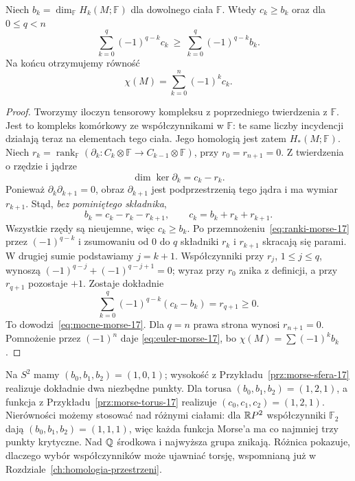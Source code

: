 \begin{twierdzenie}
\label{thm:nierownosci-morse-17}
Niech $b_k=\dim_{\mathbb F}H_k(M;\mathbb F)$
dla dowolnego ciała $\mathbb F$.
Wtedy $c_k\geq b_k$ oraz dla
$0\leq q<n$
\begin{equation}\label{eq:mocne-morse-17}
 \sum_{k=0}^q(-1)^{q-k}c_k
 \ \geq\
 \sum_{k=0}^q(-1)^{q-k}b_k.
\end{equation}
Na końcu otrzymujemy równość
\begin{equation}\label{eq:euler-morse-17}
 \chi(M)=\sum_{k=0}^n(-1)^kc_k.
\end{equation}
\end{twierdzenie}
\begin{proof}
Tworzymy iloczyn tensorowy kompleksu z poprzedniego
twierdzenia z $\mathbb F$.
Jest to kompleks komórkowy ze współczynnikami w $\mathbb F$:
te same liczby incydencji działają teraz na elementach tego ciała.
Jego homologią jest zatem $H_*(M;\mathbb F)$.
Niech $r_k=\operatorname{rank}_{\mathbb F}
(\partial_k:C_k\otimes\mathbb F
\to C_{k-1}\otimes\mathbb F)$,
przy $r_0=r_{n+1}=0$.
Z twierdzenia o rzędzie i jądrze
\[
 \dim\ker\partial_k=c_k-r_k.
\]
Ponieważ $\partial_k\partial_{k+1}=0$,
obraz $\partial_{k+1}$ jest podprzestrzenią
tego jądra i ma wymiar $r_{k+1}$.
Stąd, \emph{bez pominiętego składnika},
\begin{equation}\label{eq:ranki-morse-17}
 b_k=c_k-r_k-r_{k+1},
 \qquad c_k=b_k+r_k+r_{k+1}.
\end{equation}
Wszystkie rzędy są nieujemne,
więc $c_k\geq b_k$.
Po przemnożeniu~\eqref{eq:ranki-morse-17}
przez $(-1)^{q-k}$ i zsumowaniu
od $0$ do $q$ składniki $r_k$
i $r_{k+1}$ skracają się parami.
W drugiej sumie podstawiamy $j=k+1$.
Współczynniki przy $r_j$, $1\leq j\leq q$, wynoszą
$(-1)^{q-j}+(-1)^{q-j+1}=0$;
wyraz przy $r_0$ znika z definicji, a przy $r_{q+1}$ pozostaje $+1$.
Zostaje dokładnie
\[
 \sum_{k=0}^q(-1)^{q-k}(c_k-b_k)
   =r_{q+1}\geq0.
\]
To dowodzi~\eqref{eq:mocne-morse-17}.
Dla $q=n$ prawa strona wynosi
$r_{n+1}=0$. Pomnożenie
przez $(-1)^n$ daje
\eqref{eq:euler-morse-17},
bo $\chi(M)=\sum(-1)^kb_k$.
\end{proof}

\begin{przyklad}
Na $S^2$ mamy $(b_0,b_1,b_2)=(1,0,1)$;
wysokość z Przykładu~\ref{prz:morse-sfera-17}
realizuje dokładnie dwa niezbędne
punkty. Dla torusa
$(b_0,b_1,b_2)=(1,2,1)$,
a funkcja z
Przykładu~\ref{prz:morse-torus-17}
realizuje $(c_0,c_1,c_2)=(1,2,1)$.
Nierówności możemy stosować
nad różnymi ciałami: dla
$\mathbb{R} P^2$ współczynniki
$\mathbb F_2$ dają
$(b_0,b_1,b_2)=(1,1,1)$,
więc każda funkcja Morse'a
ma co najmniej trzy punkty
krytyczne. Nad $\mathbb{Q}$ środkowa
i najwyższa grupa znikają.
Różnica pokazuje, dlaczego
wybór współczynników może
ujawniać torsję, wspomnianą
już w
Rozdziale~\ref{ch:homologia-przestrzeni}.
\end{przyklad}


